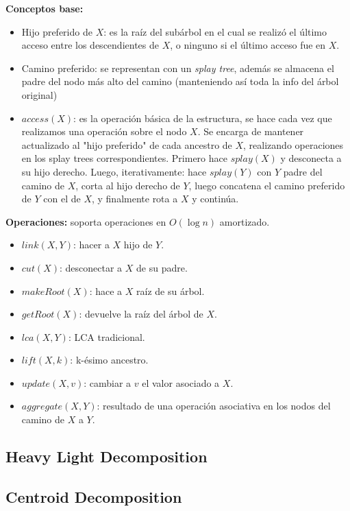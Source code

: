 {\textbf{Conceptos base:}
\begin{itemize}
    \item Hijo preferido de $X$: es la raíz del subárbol en el cual se realizó el último acceso 
    entre los descendientes de $X$, o ninguno si el último acceso fue en $X$.
    \item Camino preferido: se representan con un \emph{splay tree}, además se almacena el padre 
    del nodo más alto del camino (manteniendo así toda la info del árbol original)
    \item $access(X)$: es la operación básica de la estructura, se hace cada vez que realizamos una
    operación sobre el nodo $X$. Se encarga de mantener actualizado al "hijo preferido" de cada ancestro
    de $X$, realizando operaciones en los splay trees correspondientes. Primero hace $splay(X)$ y desconecta
    a su hijo derecho. Luego, iterativamente: hace $splay(Y)$ con $Y$ padre del camino de $X$, corta 
    al hijo derecho de $Y$, luego concatena el camino preferido de $Y$ con el de $X$, y finalmente rota 
    a $X$ y continúa.
\end{itemize}

\textbf{Operaciones:} soporta operaciones en $O(\log{}n)$ amortizado.
\begin{itemize}
    \item $link(X, Y)$: hacer a $X$ hijo de $Y$.
    \item $cut(X)$: desconectar a $X$ de su padre.
    \item $makeRoot(X)$: hace a $X$ raíz de su árbol.
    \item $getRoot(X)$: devuelve la raíz del árbol de $X$.
    \item $lca(X,Y)$: LCA tradicional.
    \item $lift(X,k)$: k-ésimo ancestro.
    \item $update(X,v)$: cambiar a $v$ el valor asociado a $X$.
    \item $aggregate(X,Y)$: resultado de una operación asociativa en los nodos del camino de $X$ a $Y$.
\end{itemize}


\subsection{Heavy Light Decomposition}
\subsection{Centroid Decomposition}
}
